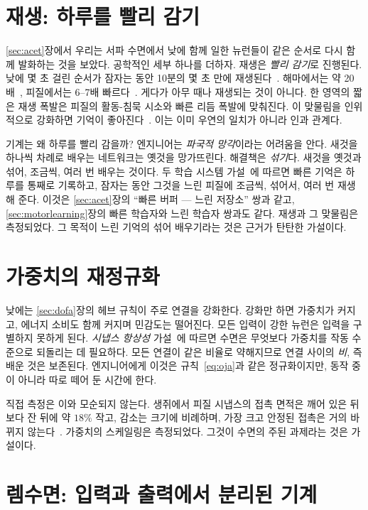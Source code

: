 \section{재생: 하루를 빨리 감기}

\ref{sec:acet}장에서 우리는 서파 수면에서 낮에 함께 일한 뉴런들이 같은 순서로 다시 함께 발화하는 것을 보았다. 공학적인 세부 하나를 더하자. 재생은 \emph{빨리 감기}로 진행된다. 낮에 몇 초 걸린 순서가 잠자는 동안 10분의 몇 초 만에 재생된다~\cite{Nadasdy1999}. 해마에서는 약 20배~\cite{LeeWilson2002}, 피질에서는 6--7배 빠르다~\cite{Euston2007}. 게다가 아무 때나 재생되는 것이 아니다. 한 영역의 짧은 재생 폭발은 피질의 활동-침묵 시소와 빠른 리듬 폭발에 맞춰진다. 이 맞물림을 인위적으로 강화하면 기억이 좋아진다~\cite{Maingret2016}. 이는 이미 우연의 일치가 아니라 인과 관계다.

기계는 왜 하루를 빨리 감을까? 엔지니어는 \emph{파국적 망각}이라는 어려움을 안다. 새것을 하나씩 차례로 배우는 네트워크는 옛것을 망가뜨린다. 해결책은 \emph{섞기}다. 새것을 옛것과 섞어, 조금씩, 여러 번 배우는 것이다. 두 학습 시스템 가설~\cite{McClelland1995}에 따르면 빠른 기억은 하루를 통째로 기록하고, 잠자는 동안 그것을 느린 피질에 조금씩, 섞어서, 여러 번 재생해 준다. 이것은 \ref{sec:acet}장의 “빠른 버퍼 --- 느린 저장소” 쌍과 같고, \ref{sec:motorlearning}장의 빠른 학습자와 느린 학습자 쌍과도 같다. 재생과 그 맞물림은 측정되었다. 그 목적이 느린 기억의 섞어 배우기라는 것은 근거가 탄탄한 가설이다.

\section{가중치의 재정규화}

낮에는 \ref{sec:dofa}장의 헤브 규칙이 주로 연결을 강화한다. 강화만 하면 가중치가 커지고, 에너지 소비도 함께 커지며 민감도는 떨어진다. 모든 입력이 강한 뉴런은 입력을 구별하지 못하게 된다. \emph{시냅스 항상성} 가설~\cite{TononiCirelli2014}에 따르면 수면은 무엇보다 가중치를 작동 수준으로 되돌리는 데 필요하다. 모든 연결이 같은 비율로 약해지므로 연결 사이의 \emph{비}, 즉 배운 것은 보존된다. 엔지니어에게 이것은 규칙~\eqref{eq:oja}과 같은 정규화이지만, 동작 중이 아니라 따로 떼어 둔 시간에 한다.

직접 측정은 이와 모순되지 않는다. 생쥐에서 피질 시냅스의 접촉 면적은 깨어 있은 뒤보다 잔 뒤에 약 $18\%$ 작고, 감소는 크기에 비례하며, 가장 크고 안정된 접촉은 거의 바뀌지 않는다~\cite{deVivo2017}. 가중치의 스케일링은 측정되었다. 그것이 수면의 주된 과제라는 것은 가설이다.

\section{렘수면: 입력과 출력에서 분리된 기계}


